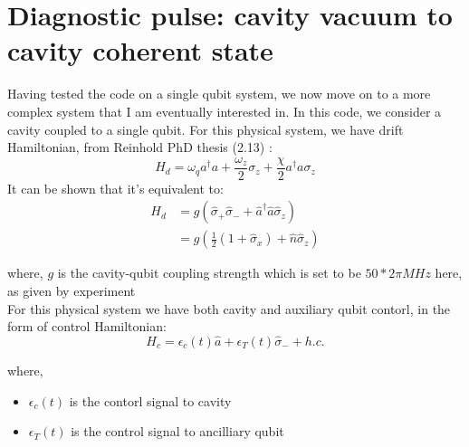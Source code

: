 \documentclass[12pt]{report}
\begin{document}



\section{Diagnostic pulse: cavity vacuum to cavity coherent state}
Having tested the code on a single qubit system, we now move on to a more complex system that I am eventually interested in. 
In this code, we consider a cavity coupled to a single qubit.
For this physical system, we have drift Hamiltonian, 
from Reinhold PhD thesis (2.13) \cite{reinhold2019}: 
\begin{equation}
    H_d = \omega_q a^\dagger a + \frac{\omega_z}{2} \sigma_z + \frac{\chi}{2} a^\dagger a \sigma_z
\end{equation}
It can be shown that it's equivalent to: %
\begin{equation}
    \begin{aligned}
    H_d &= g\left( \hat{\sigma}_+ \hat{\sigma}_- + \hat{a}^{\dagger}\hat{a}\hat{\sigma}_z \right) \\
    &= g \left( \frac{1}{2}(1+\hat{\sigma}_x) + \hat{n}\hat{\sigma}_z\right)
\end{aligned}
\end{equation}

where, $g$ is the cavity-qubit coupling strength which is set to be $50*2 \pi MHz$ here, as given by experiment
\\
For this physical system we have both cavity and auxiliary qubit contorl, in the form of control Hamiltonian: 
\begin{equation}
    H_c = \epsilon_c(t) \hat{a} + \epsilon_T(t) \hat{\sigma}_- + h.c.
\end{equation}

where, 
\begin{itemize}
    \item $\epsilon_c(t)$ is the contorl signal to cavity
    \item $\epsilon_T(t)$ is the control signal to ancilliary qubit
\end{itemize} 
\end{document}

